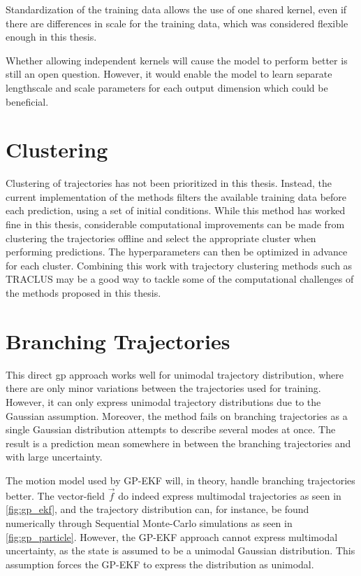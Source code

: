Standardization of the training data allows the use of one shared kernel, even if there are differences in scale for the training data, which was considered flexible enough in this thesis.

Whether allowing independent kernels will cause the model to perform better is still an open question. However, it would enable the model to learn separate lengthscale and scale parameters for each output dimension which could be beneficial. 



\section{Clustering}
Clustering of trajectories has not been prioritized in this thesis. Instead, the current implementation of the methods filters the available training data before each prediction, using a set of initial conditions. While this method has worked fine in this thesis, considerable computational improvements can be made from clustering the trajectories offline and select the appropriate cluster when performing predictions. The hyperparameters can then be optimized in advance for each cluster. Combining this work with trajectory clustering methods such as TRACLUS \cite{traclus} may be a good way to tackle some of the computational challenges of the methods proposed in this thesis.



\section{Branching Trajectories}
This direct \acrshort{gp} approach works well for unimodal trajectory distribution, where there are only minor variations between the trajectories used for training. However, it can only express unimodal trajectory distributions due to the Gaussian assumption. Moreover, the method fails on branching trajectories as a single Gaussian distribution attempts to describe several modes at once. The result is a prediction mean somewhere in between the branching trajectories and with large uncertainty. 

The motion model used by GP-EKF will, in theory, handle branching trajectories better. The vector-field $\vec{f}$ do indeed express multimodal trajectories as seen in \cref{fig:gp_ekf}, and the trajectory distribution can, for instance, be found numerically through Sequential Monte-Carlo simulations as seen in \cref{fig:gp_particle}. However, the GP-EKF approach cannot express multimodal uncertainty, as the state is assumed to be a unimodal Gaussian distribution. This assumption forces the GP-EKF to express the distribution as unimodal.  

